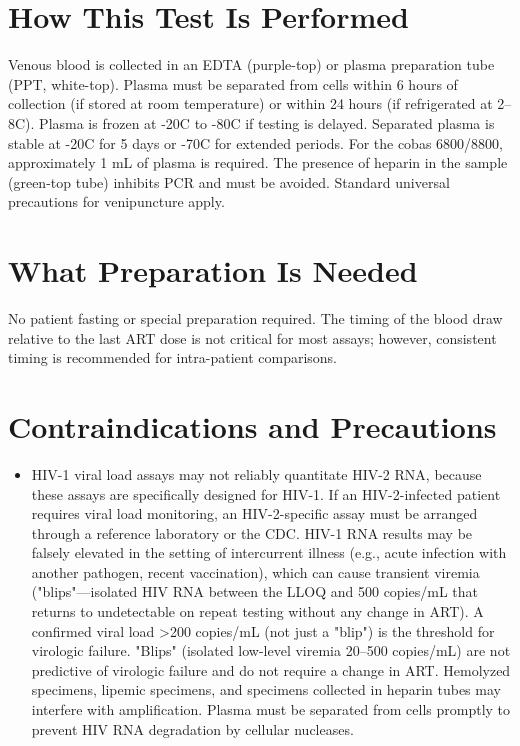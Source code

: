 \section*{How This Test Is Performed}
Venous blood is collected in an EDTA (purple-top) or plasma preparation tube (PPT, white-top). Plasma must be separated from cells within 6 hours of collection (if stored at room temperature) or within 24 hours (if refrigerated at 2--8\textdegree{}C). Plasma is frozen at -20\textdegree{}C to -80\textdegree{}C if testing is delayed. Separated plasma is stable at -20\textdegree{}C for 5 days or -70\textdegree{}C for extended periods. For the cobas 6800/8800, approximately 1 mL of plasma is required. The presence of heparin in the sample (green-top tube) inhibits PCR and must be avoided. Standard universal precautions for venipuncture apply.

\section*{What Preparation Is Needed}
No patient fasting or special preparation required. The timing of the blood draw relative to the last ART dose is not critical for most assays; however, consistent timing is recommended for intra-patient comparisons.

\section*{Contraindications and Precautions}
\begin{itemize}
  \item HIV-1 viral load assays may not reliably quantitate HIV-2 RNA, because these assays are specifically designed for HIV-1. If an HIV-2-infected patient requires viral load monitoring, an HIV-2-specific assay must be arranged through a reference laboratory or the CDC. HIV-1 RNA results may be falsely elevated in the setting of intercurrent illness (e.g., acute infection with another pathogen, recent vaccination), which can cause transient viremia ("blips"---isolated HIV RNA between the LLOQ and 500 copies/mL that returns to undetectable on repeat testing without any change in ART). A confirmed viral load >200 copies/mL (not just a "blip") is the threshold for virologic failure. "Blips" (isolated low-level viremia 20--500 copies/mL) are not predictive of virologic failure and do not require a change in ART. Hemolyzed specimens, lipemic specimens, and specimens collected in heparin tubes may interfere with amplification. Plasma must be separated from cells promptly to prevent HIV RNA degradation by cellular nucleases.
\end{itemize}
